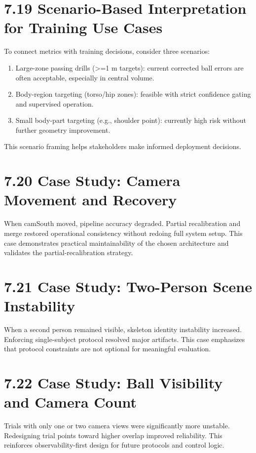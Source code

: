 \section{7.19 Scenario-Based Interpretation for Training Use Cases}
To connect metrics with training decisions, consider three scenarios:

\begin{enumerate}
  \item Large-zone passing drills (>=1 m targets): current corrected ball errors are often acceptable, especially in central volume.
  \item Body-region targeting (torso/hip zones): feasible with strict confidence gating and supervised operation.
  \item Small body-part targeting (e.g., shoulder point): currently high risk without further geometry improvement.
\end{enumerate}

This scenario framing helps stakeholders make informed deployment decisions.

\section{7.20 Case Study: Camera Movement and Recovery}
When camSouth moved, pipeline accuracy degraded. Partial recalibration and merge restored operational consistency without redoing full system setup. This case demonstrates practical maintainability of the chosen architecture and validates the partial-recalibration strategy.

\section{7.21 Case Study: Two-Person Scene Instability}
When a second person remained visible, skeleton identity instability increased. Enforcing single-subject protocol resolved major artifacts. This case emphasizes that protocol constraints are not optional for meaningful evaluation.

\section{7.22 Case Study: Ball Visibility and Camera Count}
Trials with only one or two camera views were significantly more unstable. Redesigning trial points toward higher overlap improved reliability. This reinforces observability-first design for future protocols and control logic.


